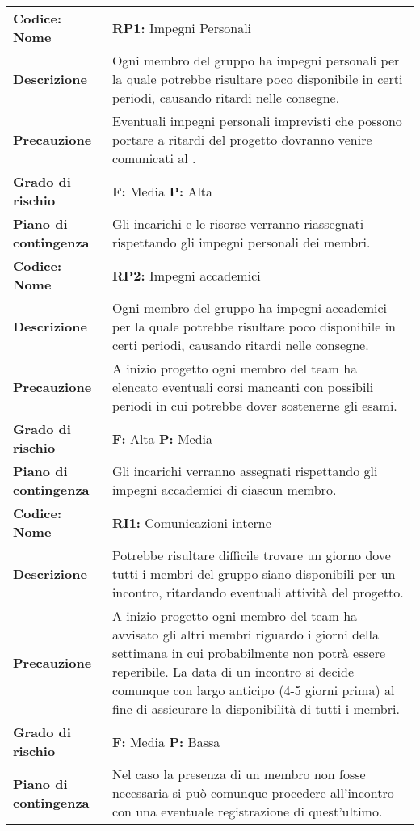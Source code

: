 {\begin{longtable}{C{3.5cm} | C{11cm}}
\textbf{Codice: Nome} & \textbf{RP1: }{Impegni Personali}\\
\textbf{Descrizione} & Ogni membro del gruppo ha impegni personali per la quale potrebbe risultare poco disponibile in certi periodi, causando ritardi nelle consegne.\\ 
\textbf{Precauzione} & Eventuali impegni personali imprevisti che possono portare a ritardi del progetto dovranno venire comunicati al \respProg{}.\\
\textbf{Grado di rischio} & \textbf{F: }Media \textbf{P: }Alta\\ 
\textbf{Piano di contingenza} & Gli incarichi e le risorse verranno riassegnati rispettando gli impegni personali dei membri.\\
\hline
\hline
{}\textbf{Codice: Nome} & \textbf{RP2: }{Impegni accademici}\\ 
\textbf{Descrizione} & Ogni membro del gruppo ha impegni accademici per la quale potrebbe risultare poco disponibile in certi periodi, causando ritardi nelle consegne.\\ 
\textbf{Precauzione} & A inizio progetto ogni membro del team ha elencato eventuali corsi mancanti con possibili periodi in cui potrebbe dover sostenerne gli esami.\\
\textbf{Grado di rischio} & \textbf{F: }Alta \textbf{P: }Media\\
\textbf{Piano di contingenza} & Gli incarichi verranno assegnati rispettando gli impegni accademici di ciascun membro.\\
\hline

\textbf{Codice: Nome} & \textbf{RI1: }{Comunicazioni interne}\\
\textbf{Descrizione} & Potrebbe risultare difficile trovare un giorno dove tutti i membri del gruppo siano disponibili per un incontro, ritardando eventuali attività del progetto.\\ 
\textbf{Precauzione} & A inizio progetto ogni membro del team ha avvisato gli altri membri riguardo i giorni della settimana in cui probabilmente non potrà essere reperibile. La data di un incontro si decide comunque con largo anticipo (4-5 giorni prima) al fine di assicurare la disponibilità di tutti i membri.\\
\textbf{Grado di rischio} & \textbf{F: }Media \textbf{P: }Bassa\\
\textbf{Piano di contingenza} & Nel caso la presenza di un membro non fosse necessaria si può comunque procedere all'incontro con una eventuale registrazione di quest'ultimo.\\
\hline


\end{longtable}}
